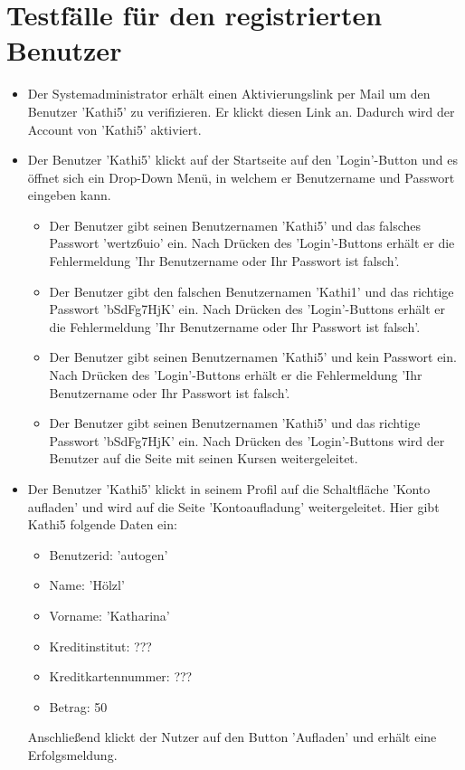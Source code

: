 \documentclass[a4paper]{scrreprt}
\newcounter{Lc}
\newcounter{Hc}
\newcommand{\stepHc}{\stepcounter{Hc}\setcounter{Lc}{0}}
\begin{document}
	\section{Testfälle für den registrierten Benutzer}
		\stepHc
		\begin{itemize}
			\item {}
			Der Systemadministrator erhält einen Aktivierungslink per Mail um den Benutzer 'Kathi5' zu verifizieren. Er klickt diesen Link an. Dadurch wird der Account von 'Kathi5' aktiviert.
			
			\item {} 
			Der Benutzer 'Kathi5' klickt auf der Startseite	auf den 'Login'-Button und es öffnet sich ein Drop-Down Menü, in welchem er Benutzername und Passwort eingeben kann.
			\begin{itemize}
				\item Der Benutzer gibt seinen Benutzernamen 'Kathi5' und das falsches Passwort 'wertz6uio' ein. Nach Drücken des 'Login'-Buttons erhält er die Fehlermeldung 'Ihr Benutzername oder Ihr Passwort ist falsch'.
				\item Der Benutzer gibt den falschen Benutzernamen 'Kathi1' und das richtige Passwort 'bSdFg7HjK' ein. Nach Drücken des 'Login'-Buttons erhält er die Fehlermeldung 'Ihr Benutzername oder Ihr Passwort ist falsch'.
				\item Der Benutzer gibt seinen Benutzernamen 'Kathi5' und kein Passwort ein. Nach Drücken des 'Login'-Buttons erhält er die Fehlermeldung 'Ihr Benutzername oder Ihr Passwort ist falsch'.
				\item Der Benutzer gibt seinen Benutzernamen 'Kathi5' und das richtige Passwort 'bSdFg7HjK' ein. Nach Drücken des 'Login'-Buttons wird der Benutzer auf die Seite mit seinen Kursen weitergeleitet.
			\end{itemize}
			
			\item {} 
			Der Benutzer 'Kathi5' klickt in seinem Profil auf die Schaltfläche 'Konto aufladen' und wird auf die Seite 'Kontoaufladung' weitergeleitet. Hier gibt Kathi5 folgende Daten ein:
				 \begin{itemize}
				 	\item Benutzerid: 'autogen'
				 	\item Name: 'Hölzl'
				 	\item Vorname: 'Katharina'
				 	\item Kreditinstitut: ???
				 	\item Kreditkartennummer: ???
				 	\item Betrag: 50 
				 \end{itemize}	
			Anschließend klickt der Nutzer auf den Button 'Aufladen' und erhält eine Erfolgsmeldung.
			\end{itemize}
			
\end{document}
